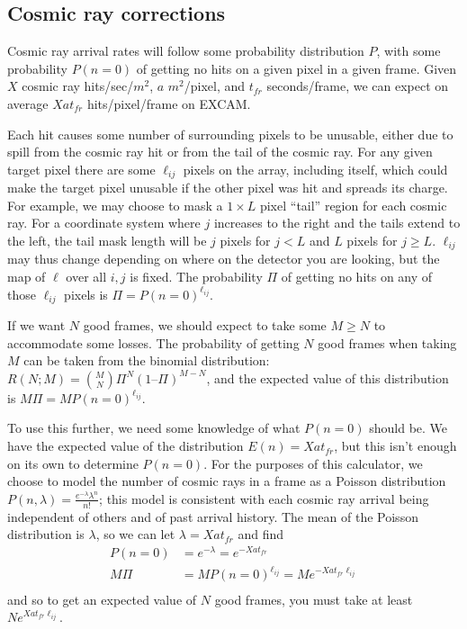 \documentclass{article}
\begin{document}
\subsection{Cosmic ray corrections}

Cosmic ray arrival rates will follow some probability distribution $P$, with some probability $P(n=0)$ of getting no hits on a given pixel in a given frame.  Given $X$ cosmic ray hits/sec/$m^2$, $a$ $m^2$/pixel, and $t_{fr}$ seconds/frame, we can expect on average $Xat_{fr}$ hits/pixel/frame on EXCAM.

Each hit causes some number of surrounding pixels to be unusable, either due to spill from the cosmic ray hit or from the tail of the cosmic ray.  For any given target pixel there are some $\ell_{ij}$ pixels on the array, including itself, which could make the target pixel unusable if the other pixel was hit and spreads its charge.  For example, we may choose to mask a $1 \times L$ pixel ``tail'' region for each cosmic ray. For a coordinate system where $j$ increases to the right and the tails extend to the left, the tail mask length will be $j$ pixels for $j<L$ and $L$ pixels for $j \geq L$.  $\ell_{ij}$ may thus change depending on where on the detector you are looking, but the map of $\ell$ over all $i,j$ is fixed.  The probability $\Pi$ of getting no hits on any of those $\ell_{ij}$ pixels is $\Pi = P(n=0)^{\ell_{ij}}$.

If we want $N$ good frames, we should expect to take some $M \geq N$ to accommodate some losses.  The probability of getting $N$ good frames when taking $M$ can be taken from the binomial distribution: $R(N; M) = \binom{M}{N} \Pi^N (1 – \Pi)^{M-N}$, and the expected value of this distribution is $M \Pi = M P(n=0)^{\ell_{ij}}$.

To use this further, we need some knowledge of what $P(n=0)$ should be.  We have the expected value of the distribution $E(n) = Xat_{fr}$, but this isn't enough on its own to determine $P(n=0)$.  For the purposes of this calculator, we choose to model the number of cosmic rays in a frame as a Poisson distribution $P(n, \lambda) = \frac{e^{-\lambda} \lambda^{n}}{n!}$; this model is consistent with each cosmic ray arrival being independent of others and of past arrival history.  The mean of the Poisson distribution is $\lambda$, so we can let $\lambda = Xat_{fr}$ and find
\begin{align}
P(n=0) &= e^{-\lambda} =  e^{-Xat_{fr}}\\
M\Pi &= M P(n=0)^{\ell_{ij}} = M  e^{-Xat_{fr} \ell_{ij}} \\
\end{align}
and so to get an expected value of $N$ good frames, you must take at least $N  e^{X a t_{fr} \ell_{ij}}$.
\end{document}
